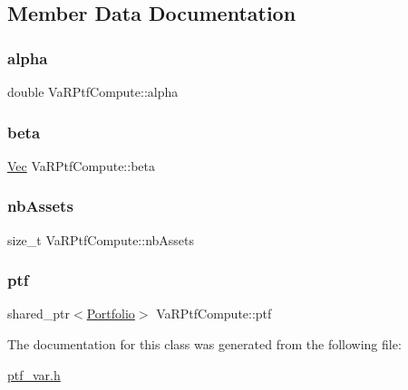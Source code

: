 \subsection{Member Data Documentation}
\hypertarget{classVaRPtfCompute_aa56625fe3b4517b29343d23a6fe5ecad}{}\label{classVaRPtfCompute_aa56625fe3b4517b29343d23a6fe5ecad} 
\subsubsection{\texorpdfstring{alpha}{alpha}}
{\footnotesize\ttfamily double Va\+R\+Ptf\+Compute\+::alpha\hspace{0.3cm}{\ttfamily [protected]}}

\hypertarget{classVaRPtfCompute_a6463d2c66463890a7e8e720f2865021a}{}\label{classVaRPtfCompute_a6463d2c66463890a7e8e720f2865021a} 
\subsubsection{\texorpdfstring{beta}{beta}}
{\footnotesize\ttfamily \hyperlink{compute__returns__eigen_8h_a1eb6a9306ef406d7975f3cbf2e247777}{Vec} Va\+R\+Ptf\+Compute\+::beta\hspace{0.3cm}{\ttfamily [protected]}}

\hypertarget{classVaRPtfCompute_a8461d45e60e76c7205f7f98e1c44ccc6}{}\label{classVaRPtfCompute_a8461d45e60e76c7205f7f98e1c44ccc6} 
\subsubsection{\texorpdfstring{nb\+Assets}{nbAssets}}
{\footnotesize\ttfamily size\+\_\+t Va\+R\+Ptf\+Compute\+::nb\+Assets\hspace{0.3cm}{\ttfamily [protected]}}

\hypertarget{classVaRPtfCompute_a67c2129848686adc86d76dfa95089116}{}\label{classVaRPtfCompute_a67c2129848686adc86d76dfa95089116} 
\subsubsection{\texorpdfstring{ptf}{ptf}}
{\footnotesize\ttfamily shared\+\_\+ptr$<$\hyperlink{classPortfolio}{Portfolio}$>$ Va\+R\+Ptf\+Compute\+::ptf\hspace{0.3cm}{\ttfamily [protected]}}



The documentation for this class was generated from the following file\+:\begin{DoxyCompactItemize}
\item 
\hyperlink{ptf__var_8h}{ptf\+\_\+var.\+h}\end{DoxyCompactItemize}
